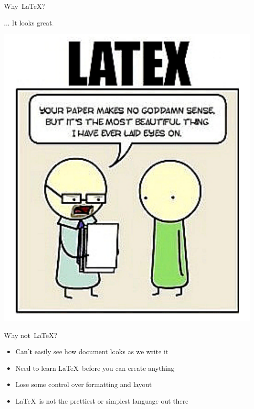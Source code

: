 \documentclass[mathserif]{beamer}
\begin{document}
\begin{frame}{Why~\LaTeX?}

... It looks great.

\begin{center}
    \includegraphics[scale=0.32]{img/Latex_beautiful}
\end{center}

\end{frame}

\begin{frame}{Why not~\LaTeX?}

\begin{itemize}
	\item Can't easily see how document looks as we write it
	\item Need to learn \LaTeX\ before you can create anything
	\item Lose some control over formatting and layout
	\item \LaTeX\ is not the prettiest or simplest language out there
\end{itemize}

\end{frame}
\end{document}
